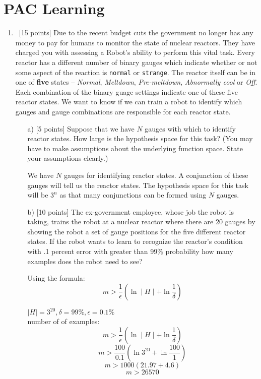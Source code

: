 \section{PAC Learning}
\label{sec:pac-learning}
\begin{enumerate}

\item ~[15 points] Due to the recent budget cuts the government no
  longer has any money to pay for humans to monitor the state of
  nuclear reactors. They have charged you with assessing a Robot's
  ability to perform this vital task. Every reactor has a different
  number of binary gauges which indicate whether or not some aspect of
  the reaction is {\tt normal} or {\tt strange}. The reactor itself
  can be in one of {\bf five} states -- {\em Normal}, {\em Meltdown},
  {\em Pre-meltdown}, {\em Abnormally cool} or {\em Off}. Each
  combination of the binary guage settings indicate one of these five
  reactor states. We want to know if we can train a robot to identify
  which gauges and gauge combinations are responsible for each reactor
  state.

  \begin{enumerate}
  \item [a)][5 points] Suppose that we have $N$ gauges with which to
    identify reactor states. How large is the hypothesis space for
    this task? (You may have to make assumptions about the underlying
    function space. State your assumptions clearly.)
\begin{solution}
We have $N$ gauges for identifying reactor states. A conjunction of  these gauges will tell us the reactor states. The hypothesis space for this task will be $3^n$ as that many conjunctions can be formed using $N$ gauges.
\end{solution}
  \item[b)] [10 points] The ex-government employee, whose job the
    robot is taking, trains the robot at a nuclear reactor where there
    are 20 gauges by showing the robot a set of gauge positions for
    the five different reactor states. If the robot wants to learn to
    recognize the reactor's condition with .1 percent error with
    greater than 99\% probability how many examples does the robot
    need to see?
\begin{solution}
Using the formula:
\[ m > \frac{1}{\epsilon}\left(\ln \mid H\mid + \ln \frac{1}{\delta}\right)\]

$\mid H\mid = 3^{20} ,  \delta = 99\%, \epsilon = 0.1\%$ \\
number of of examples:
\[ m > \frac{1}{\epsilon}\left(\ln \mid H\mid + \ln \frac{1}{\delta}\right)\]
\[ m > \frac{100}{0.1}\left(\ln 3^{20} + \ln \frac{100}{1}\right)\]
\[ m > 1000\left(21.97 + 4.6\right)\]
\[ m > 26570\]


\end{solution}
\end{enumerate}
\end{enumerate}

